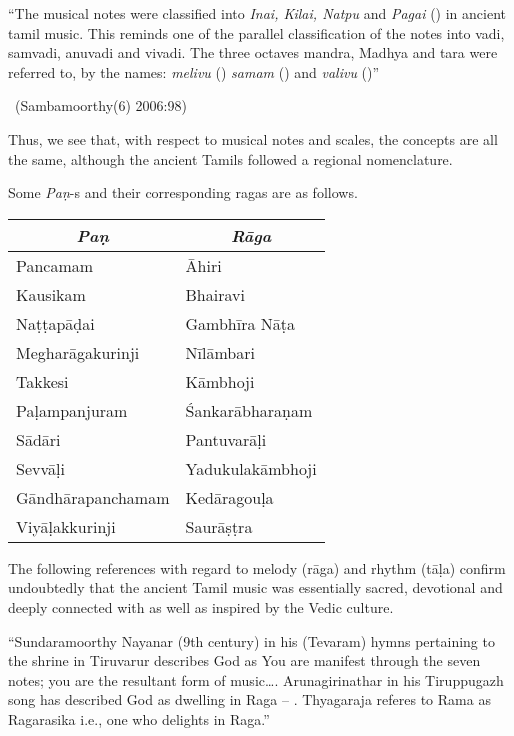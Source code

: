 \begin{myquote}
“The musical notes were classified into \textit{Inai, Kilai, Natpu} and \textit{Pagai} () in ancient tamil music. This reminds one of the parallel classification of the notes into vadi, samvadi, anuvadi and vivadi. The three octaves mandra, Madhya and tara were referred to, by the names: \textit{melivu} () \textit{samam} () and \textit{valivu} ()”

~\hfill (Sambamoorthy(6) 2006:98)
\end{myquote}

Thus, we see that, with respect to musical notes and scales, the concepts are all the same, although the ancient Tamils followed a regional nomenclature.

Some \textit{Paṇ}-s and their corresponding ragas are as follows.

\begin{longtable}{@{}|l|l|@{}}
\hline
\multicolumn{1}{|c|}{\textit{Paṇ}} & \multicolumn{1}{c|}{\textit{Rāga}} \\
\hline
Pancamam & Āhiri \\
\hline
Kausikam & Bhairavi \\
\hline
Naṭṭapāḍai & Gambhīra Nāṭa \\
\hline
Megharāgakurinji & Nīlāmbari \\
\hline
Takkesi & Kāmbhoji \\
\hline
Paḷampanjuram & Śankarābharaṇam \\
\hline
Sādāri & Pantuvarāḷi \\
\hline
Sevvāḷi & Yadukulakāmbhoji \\
\hline
Gāndhārapanchamam & Kedāragouḷa \\
\hline
Viyāḷakkurinji & Saurāṣṭra \\
\hline
\end{longtable}

The following references with regard to melody (rāga) and rhythm (tāḷa) confirm undoubtedly that the ancient Tamil music was essentially sacred, devotional and deeply connected with as well as inspired by the Vedic culture.

\begin{myquote}
“Sundaramoorthy Nayanar (9th century) in his (Tevaram) hymns pertaining to the shrine in Tiruvarur describes God as  You are manifest through the seven notes; you are the resultant form of music…. Arunagirinathar in his Tiruppugazh song has described God as dwelling in Raga – . Thyagaraja referes to Rama as Ragarasika i.e., one who delights in Raga.”
\end{myquote}

